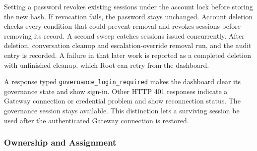 {Setting a password revokes existing sessions under the account lock before
storing the new hash. If revocation fails, the password stays unchanged.
Account deletion checks every condition that could prevent removal and revokes sessions before
removing its record. A second sweep catches sessions issued concurrently.
After deletion, conversation cleanup and escalation-override removal run, and
the audit entry is recorded. A failure in that later work is reported as a completed deletion
with unfinished cleanup, which Root can retry from the dashboard.

A response typed \texttt{governance\_login\_required} makes the dashboard clear
its governance state and show sign-in. Other HTTP 401 responses indicate a
Gateway connection or credential problem and show reconnection status. The
governance session stays available. This distinction lets a surviving session be
used after the authenticated Gateway connection is restored.}

\subsubsection{Ownership and Assignment}
\label{sec:gov-ownership-assignment}

